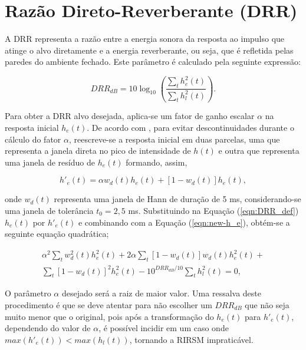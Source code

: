 \section{Razão Direto-Reverberante (DRR)}


A DRR representa a razão entre a energia sonora da resposta ao impulso que atinge o alvo diretamente e a energia reverberante,
ou seja, que é refletida pelas paredes do ambiente fechado. Este parâmetro é calculado pela seguinte expressão:

\begin{equation} \label{eqn:DRR_def}
    DRR_{dB} = 10 \log_{10} \left( \frac{\sum_t h^2_e(t)}{\sum_t h^2_l(t)} \right).
\end{equation}

Para obter a DRR alvo desejada, aplica-se um fator de ganho escalar $\alpha$ na resposta inicial $h_e(t)$.
De acordo com \cite{RIR_Data_Aug}, para evitar descontinuidades durante o cálculo do fator $\alpha$, reescreve-se a
resposta inicial em duas parcelas, uma que representa a janela direta no pico de intensidade de $h(t)$ e outra
que representa uma janela de resíduo de $h_e(t)$ formando, assim,

\begin{equation} \label{eqn:new-h_e}
    h'_e(t) = \alpha w_d(t) h_e(t) + [1 - w_d(t)]h_e(t),
\end{equation}

\noindent
onde $w_d(t)$ representa uma janela de Hann de duração de 5 ms, considerando-se uma janela de tolerância $t_0 = 2,5$ ms.
Substituindo na Equação (\ref{eqn:DRR_def}) $h_e(t)$ por $h'_e(t)$ e combinando com a Equação (\ref{eqn:new-h_e}), obtém-se
a seguinte equação quadrática;

\begin{equation} \label{eqn:DRR_quad_eqn}
    \begin{aligned} 
        \alpha^2 \sum_t w^2_d(t) h^2_e(t) +
        2 \alpha \sum_t [1 - w_d(t)] w_d(t) h^2_e(t) + \\
        \sum_t [1 - w_d(t)]^2 h^2_e(t) -
        10^{DRR_{dB}/10} \sum_t h^2_l(t)
        = 0 ,
    \end{aligned}
\end{equation}

O parâmetro $\alpha$ desejado será a raiz de maior valor. 
Uma ressalva deste procedimento é que se deve atentar para não escolher um $DRR_{dB}$ que não seja muito menor que o original,
pois após a transformação do $h_e(t)$ para $h'_e(t)$, dependendo do valor de $\alpha$, é possível incidir em um caso onde
$max(h'_e(t)) < max(h_l(t))$, tornando a RIRSM impraticável.

